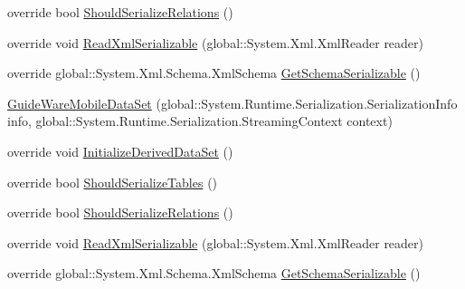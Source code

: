 \begin{DoxyCompactItemize}
\item 
override bool \hyperlink{class_env_int_1_1_win32_1_1_field_tech_1_1_manager_1_1_data_sets_1_1_guide_ware_mobile_data_set_a681c962716335a5abcdbb317136a09ec}{Should\+Serialize\+Relations} ()
\item 
override void \hyperlink{class_env_int_1_1_win32_1_1_field_tech_1_1_manager_1_1_data_sets_1_1_guide_ware_mobile_data_set_ae591f1568d8b6daeb4b1b47973e4777e}{Read\+Xml\+Serializable} (global\+::\+System.\+Xml.\+Xml\+Reader reader)
\item 
override global\+::\+System.\+Xml.\+Schema.\+Xml\+Schema \hyperlink{class_env_int_1_1_win32_1_1_field_tech_1_1_manager_1_1_data_sets_1_1_guide_ware_mobile_data_set_a75399b922a2a3cf266e38a8e73c78a7c}{Get\+Schema\+Serializable} ()
\item 
\hyperlink{class_env_int_1_1_win32_1_1_field_tech_1_1_manager_1_1_data_sets_1_1_guide_ware_mobile_data_set_abcd4fc364c650c863fe0395878eba18a}{Guide\+Ware\+Mobile\+Data\+Set} (global\+::\+System.\+Runtime.\+Serialization.\+Serialization\+Info info, global\+::\+System.\+Runtime.\+Serialization.\+Streaming\+Context context)
\item 
override void \hyperlink{class_env_int_1_1_win32_1_1_field_tech_1_1_manager_1_1_data_sets_1_1_guide_ware_mobile_data_set_a732ff06fb24d4afabbf9208c37b83960}{Initialize\+Derived\+Data\+Set} ()
\item 
override bool \hyperlink{class_env_int_1_1_win32_1_1_field_tech_1_1_manager_1_1_data_sets_1_1_guide_ware_mobile_data_set_a2d30dace6369e9657f24e6832ae183f0}{Should\+Serialize\+Tables} ()
\item 
override bool \hyperlink{class_env_int_1_1_win32_1_1_field_tech_1_1_manager_1_1_data_sets_1_1_guide_ware_mobile_data_set_a681c962716335a5abcdbb317136a09ec}{Should\+Serialize\+Relations} ()
\item 
override void \hyperlink{class_env_int_1_1_win32_1_1_field_tech_1_1_manager_1_1_data_sets_1_1_guide_ware_mobile_data_set_ae591f1568d8b6daeb4b1b47973e4777e}{Read\+Xml\+Serializable} (global\+::\+System.\+Xml.\+Xml\+Reader reader)
\item 
override global\+::\+System.\+Xml.\+Schema.\+Xml\+Schema \hyperlink{class_env_int_1_1_win32_1_1_field_tech_1_1_manager_1_1_data_sets_1_1_guide_ware_mobile_data_set_a75399b922a2a3cf266e38a8e73c78a7c}{Get\+Schema\+Serializable} ()
\end{DoxyCompactItemize}
